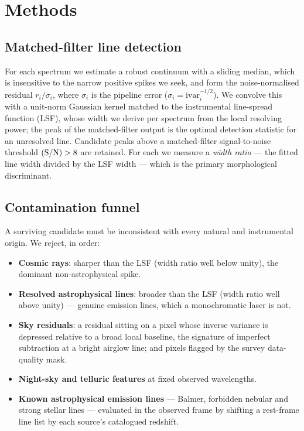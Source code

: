\documentclass[11pt]{article}
\begin{document}
\section{Methods}
\label{sec:methods}

\subsection{Matched-filter line detection}
For each spectrum we estimate a robust continuum with a sliding median, which is
insensitive to the narrow positive spikes we seek, and form the noise-normalised
residual $r_i/\sigma_i$, where $\sigma_i$ is the pipeline error
($\sigma_i = \mathrm{ivar}_i^{-1/2}$). We convolve this with a unit-norm Gaussian
kernel matched to the instrumental line-spread function (LSF), whose width we
derive per spectrum from the local resolving power; the peak of the matched-filter
output is the optimal detection statistic for an unresolved line. Candidate peaks
above a matched-filter signal-to-noise threshold $\mathrm{(S/N)}>8$
are retained. For each we measure a \emph{width ratio} --- the fitted line width
divided by the LSF width --- which is the primary morphological discriminant.

\subsection{Contamination funnel}
A surviving candidate must be inconsistent with every natural and instrumental
origin. We reject, in order:
\begin{itemize}
\item \textbf{Cosmic rays}: sharper than the LSF (width ratio well below unity),
the dominant non-astrophysical spike.
\item \textbf{Resolved astrophysical lines}: broader than the LSF (width ratio
well above unity) --- genuine emission lines, which a monochromatic laser is not.
\item \textbf{Sky residuals}: a residual sitting on a pixel whose inverse variance
is depressed relative to a broad local baseline, the signature of imperfect
subtraction at a bright airglow line; and pixels flagged by the survey
data-quality mask.
\item \textbf{Night-sky and telluric features} at fixed observed wavelengths.
\item \textbf{Known astrophysical emission lines} --- Balmer, forbidden nebular and
strong stellar lines --- evaluated in the observed frame by shifting a rest-frame
line list by each source's catalogued redshift.
\end{itemize}
\end{document}
